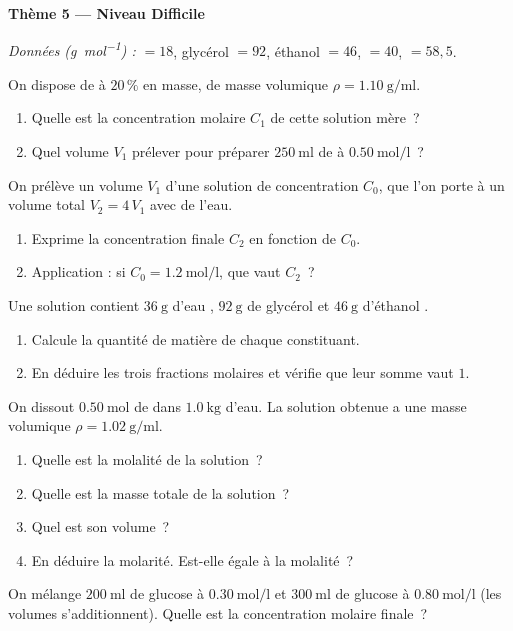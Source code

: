 \documentclass[11pt,a4paper]{article}
\begin{document}
\begin{center}{\large\bfseries\color{primarydark} Thème 5 — Niveau Difficile}\end{center}
\emph{Données (\si{\gram\per\mole}) :} $=18$, glycérol $=92$, éthanol $=46$,
$=40$, $=58{,}5$.

\begin{exo}
On dispose de  à $20\,\%$ en masse, de masse volumique $\rho = \SI{1.10}{\gram\per\milli\litre}$.
\begin{enumerate}[label=\alph*)]
  \item Quelle est la concentration molaire $C_1$ de cette solution mère~?
  \item Quel volume $V_1$ prélever pour préparer $\SI{250}{\milli\litre}$ de  à $\SI{0.50}{\mole\per\litre}$~?
\end{enumerate}
\end{exo}

\begin{exo}
On prélève un volume $V_1$ d'une solution de concentration $C_0$, que l'on porte à un volume total
$V_2 = 4\,V_1$ avec de l'eau.
\begin{enumerate}[label=\alph*)]
  \item Exprime la concentration finale $C_2$ en fonction de $C_0$.
  \item Application : si $C_0 = \SI{1.2}{\mole\per\litre}$, que vaut $C_2$~?
\end{enumerate}
\end{exo}

\begin{exo}
Une solution contient $\SI{36}{\gram}$ d'eau , $\SI{92}{\gram}$ de glycérol  et
$\SI{46}{\gram}$ d'éthanol .
\begin{enumerate}[label=\alph*)]
  \item Calcule la quantité de matière de chaque constituant.
  \item En déduire les trois fractions molaires et vérifie que leur somme vaut $1$.
\end{enumerate}
\end{exo}

\begin{exo}
On dissout $\SI{0.50}{\mole}$ de  dans $\SI{1.0}{\kilo\gram}$ d'eau. La solution obtenue a
une masse volumique $\rho = \SI{1.02}{\gram\per\milli\litre}$.
\begin{enumerate}[label=\alph*)]
  \item Quelle est la molalité de la solution~?
  \item Quelle est la masse totale de la solution~?
  \item Quel est son volume~?
  \item En déduire la molarité. Est-elle égale à la molalité~?
\end{enumerate}
\end{exo}

\begin{exo}
On mélange $\SI{200}{\milli\litre}$ de glucose à $\SI{0.30}{\mole\per\litre}$ et $\SI{300}{\milli\litre}$
de glucose à $\SI{0.80}{\mole\per\litre}$ (les volumes s'additionnent). Quelle est la concentration
molaire finale~?
\end{exo}
\end{document}
